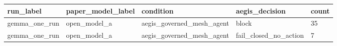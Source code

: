 \begin{tabular}{lllll}
 \hline
run\_label & paper\_model\_label & condition & aegis\_decision & count \\
 \hline
gemma\_one\_run & open\_model\_a & aegis\_governed\_mesh\_agent & block & 35 \\
gemma\_one\_run & open\_model\_a & aegis\_governed\_mesh\_agent & fail\_closed\_no\_action & 7 \\
 \hline
\end{tabular}
